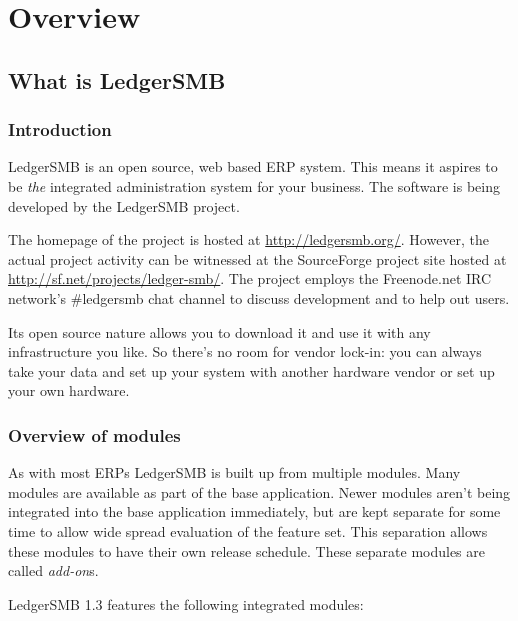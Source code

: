 
\part{Overview}

\chapter{What is LedgerSMB}

\section{Introduction}
LedgerSMB is an open source, web based ERP system. This means it aspires to be
\textit{the} integrated administration system for your business.
The software is being developed by the LedgerSMB project.

The homepage of the project is hosted at \url{http://ledgersmb.org/}.
However, the actual project activity can be witnessed at the SourceForge
project site hosted at \url{http://sf.net/projects/ledger-smb/}.  The project
employs the Freenode.net IRC network's \#ledgersmb chat channel to discuss development
and to help out users.

Its open source nature allows you to download it and use it with any
infrastructure you like. So there's no room for vendor lock-in: you can
always take your data and set up your system with another hardware vendor
or set up your own hardware.

\section{Overview of modules}
\label{sec:ModuleOverview}
As with most ERPs LedgerSMB is built up from multiple modules.  Many modules are
available as part of the base application.  Newer modules aren't being integrated
into the base application immediately, but are kept separate for some time to allow
wide spread evaluation of the feature set.  This separation allows these modules
to have their own release schedule.  These separate modules are called \textit{add-on}s.

LedgerSMB 1.3 features the following integrated modules:

